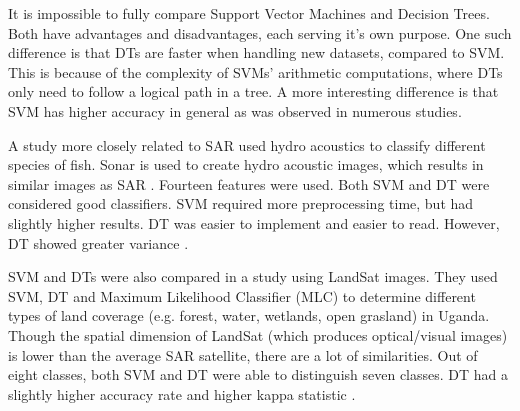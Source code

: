 \hspace{0.5cm} It is impossible to fully compare Support Vector Machines and Decision Trees. Both have advantages and disadvantages, each serving it's own purpose. One such difference is that DTs are faster when handling new datasets, compared to SVM. This is because of the complexity of SVMs' arithmetic computations, where DTs only need to follow a logical path in a tree. A more interesting difference is that SVM has higher accuracy in general as was observed in numerous studies\cite{arun2010hybrid}.
 
A study more closely related to SAR used hydro acoustics to classify different species of fish. Sonar is used to create hydro acoustic images, which results in similar images as SAR \cite{griffiths2003synthetic}. Fourteen features were used. Both SVM and DT were considered good classifiers. SVM required more preprocessing time, but had slightly higher results. DT was easier to implement and easier to read. However, DT showed greater variance \cite{Robotham2011170}.

SVM and DTs were also compared in a study using LandSat images. They used SVM, DT and Maximum Likelihood Classifier (MLC) to determine different types of land coverage (e.g. forest, water, wetlands, open grasland) in Uganda. Though the spatial dimension of LandSat (which produces optical/visual images) is lower than the average SAR satellite, there are a lot of similarities. Out of eight classes, both SVM and DT were able to distinguish seven classes. DT had a slightly higher accuracy rate and higher kappa statistic \cite{Otukei2010S27}.



